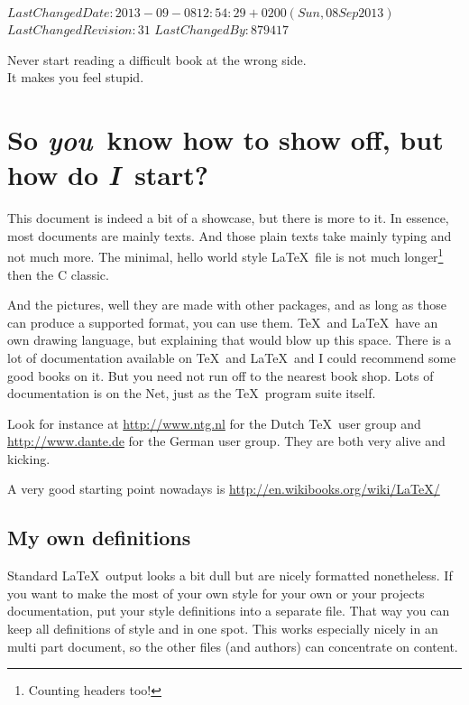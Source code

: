 %
{$LastChangedDate: 2013-09-08 12:54:29 +0200 (Sun, 08 Sep 2013) $}%
{$LastChangedRevision: 31 $}%
{$LastChangedBy: 879417 $}
\renewcommand\TheFile{poser.tex}
\begin{savequote}[8cm]
  \sffamily
  Never start reading a difficult book at the wrong side.\\ 
  It makes you feel stupid.
\end{savequote}
\chapter{So {\em you}\ know how to show off, but how do {\em I}\
  start?} 


This document is indeed a bit of a showcase, but there is more to it.
In essence, most documents are mainly texts. 
And those plain texts take mainly typing and not much more.
The minimal, hello world style \LaTeX\ file is not much 
longer\footnote{Counting headers too!} then the C classic.


And the pictures, well they are made with other packages, and as long
as those can produce a supported format, you can use them. \TeX\ and
\LaTeX\ have an own drawing language, but explaining that would blow
up this space.
There is a lot of documentation available on \TeX\ and \LaTeX\ and I
could recommend some good books on it.
But you need not run off to the nearest book shop. Lots of
documentation is on the Net, just as the \TeX\ program suite itself. 

Look for instance at \url{http://www.ntg.nl} for the Dutch \TeX\ user group
and \url{http://www.dante.de} for the German user group. They are both very 
alive and kicking.

A very good starting point nowadays is \url{http://en.wikibooks.org/wiki/LaTeX/}

\section{My own definitions}
Standard \LaTeX\ output looks a bit dull but are nicely formatted nonetheless.
If you want to make the most of your own style for your own or your
projects documentation, put your style definitions into a separate
file. That way you can keep all definitions of style and  in one
spot. This works especially nicely in an multi part document, so
the other files (and authors) can concentrate on content.

